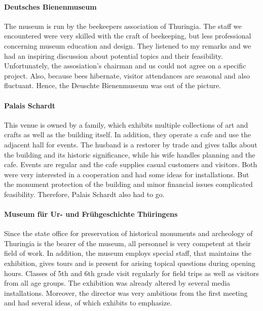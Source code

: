 \paragraph{Deutsches Bienenmuseum} 

The museum is run by the beekeepers association of Thuringia. The staff we encountered were very skilled with the craft of beekeeping, but less professional concerning museum education and design. They listened to my remarks and we had an inspiring discussion about potential topics and their feasibility. Unfortunately, the assosiation's chairman and us could not agree on a specific project. Also, because bees hibernate, visitor attendances are seasonal and also fluctuant. Hence, the Deuschte Bienenmuseum was out of the picture.

\paragraph{Palais Schardt} 

This venue is owned by a family, which exhibits multiple collections of art and crafts as well as the building itself. In addition, they operate a cafe and use the adjacent hall for events. The husband is a restorer by trade and gives talks about the building and its historic significance, while his wife handles planning and the cafe. Events are regular and the cafe supplies casual customers and visitors. Both were very interested in a cooperation and had some ideas for installations. But the monument protection of the building and minor financial issues complicated feasibility. Therefore, Palais Schardt also had to go.    

\paragraph{Museum für Ur- und Frühgeschichte Thüringens} 

Since the state office for preservation of historical monuments and archeology of Thuringia is the bearer of the museum, all personnel is very competent at their field of work. In addition, the museum employs special staff, that maintains the exhibition, gives tours and is present for arising topical questions during opening hours. Classes of 5th and 6th grade visit regularly for field trips as well as visitors from all age groups. The exhibition was already altered by several media installations. Moreover, the director was very ambitious from the first meeting and had several ideas, of which exhibits to emphasize.

